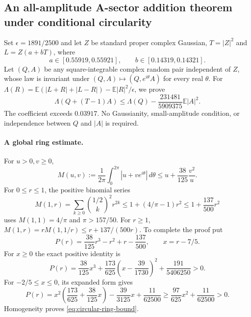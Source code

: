 \subsection{An all-amplitude A-sector addition theorem under conditional circularity}
\label{sec:circular-a-addition}

Set $\epsilon=1891/2500$ and let $Z$ be standard proper complex Gaussian,
$T=|Z|^2$ and $L=Z(a+bT)$, where
\[
 a\in[0.55919,0.55921],\qquad b\in[0.14319,0.14321].
\]
Let $(Q,A)$ be any square-integrable complex random pair independent of
$Z$, whose law is invariant under $(Q,A)\mapsto(Q,e^{i\theta}A)$ for
every real $\theta$. For
$\Lambda(R)=\mathbb E(|L+R|+|L-R|)-\mathbb E|R|^2/\epsilon$, we prove
\begin{equation}\label{eq:circular-a-theorem}
 \boxed{\Lambda(Q+(T-1)A)\le\Lambda(Q)
       -\frac{231481}{5909375}\mathbb E|A|^2.}
\end{equation}
The coefficient exceeds $0.03917$. No Gaussianity, small-amplitude
condition, or independence between $Q$ and $|A|$ is required.

\paragraph{A global ring estimate.}
For $u>0,v\ge0$,
\begin{equation}\label{eq:circular-ring-bound}
 M(u,v):=\frac1{2\pi}\int_0^{2\pi}|u+ve^{i\theta}|\,d\theta
 \le u+\frac{38}{125}\frac{v^2}{u}.
\end{equation}
For $0\le r\le1$, the positive binomial series
\[
 M(1,r)=\sum_{k\ge0}\binom{1/2}{k}^{\!2}r^{2k}
 \le1+(4/\pi-1)r^2\le1+\frac{137}{500}r^2
\]
uses $M(1,1)=4/\pi$ and $\pi>157/50$. For $r\ge1$,
$M(1,r)=rM(1,1/r)\le r+137/(500r)$. To complete the proof put
\[
 P(r)=\frac{38}{125}r^3-r^2+r-\frac{137}{500},\qquad x=r-7/5.
\]
For $x\ge0$ the exact positive identity is
\[
 P(r)=\frac{38}{125}x^3+
 \frac{173}{625}\left(x-\frac{39}{1730}\right)^2+
 \frac{191}{5406250}>0.
\]
For $-2/5\le x\le0$, its expanded form gives
\[
 P(r)=x^2\left(\frac{173}{625}+\frac{38}{125}x\right)
 -\frac{39}{3125}x+\frac{11}{62500}
 \ge\frac{97}{625}x^2+\frac{11}{62500}>0.
\]
Homogeneity proves \eqref{eq:circular-ring-bound}.

